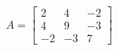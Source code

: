 \documentclass[preview]{standalone}
\begin{document}
\begin{align*}
A = \begin{bmatrix} 2 & 4 & -2 \\ 4 & 9 & -3 \\ -2 & -3 & 7 \end{bmatrix}
\end{align*}
\end{document}
